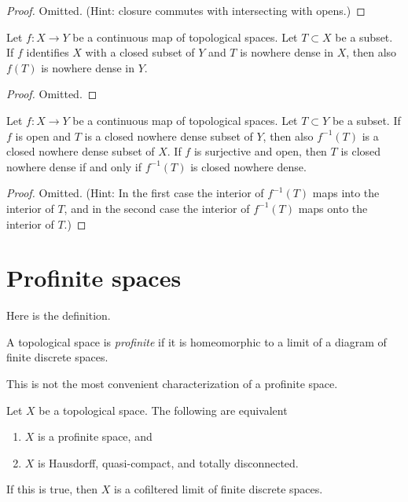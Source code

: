 \begin{proof}
Omitted. (Hint: closure commutes with intersecting with opens.)
\end{proof}

\begin{lemma}
\label{lemma-closed-image-nowhere-dense}
Let $f : X \to Y$ be a continuous map of topological spaces.
Let $T \subset X$ be a subset.
If $f$ identifies $X$ with a closed subset of $Y$
and $T$ is nowhere dense in $X$, then also $f(T)$ is nowhere dense in $Y$.
\end{lemma}

\begin{proof}
Omitted.
\end{proof}

\begin{lemma}
\label{lemma-open-inverse-image-closed-nowhere-dense}
Let $f : X \to Y$ be a continuous map of topological spaces.
Let $T \subset Y$ be a subset.
If $f$ is open and $T$ is a closed nowhere dense subset of $Y$,
then also $f^{-1}(T)$ is a closed nowhere dense subset of $X$.
If $f$ is surjective and open, then
$T$ is closed nowhere dense if and only
if $f^{-1}(T)$ is closed nowhere dense.
\end{lemma}

\begin{proof}
Omitted. (Hint: In the first case the interior of $f^{-1}(T)$
maps into the interior of $T$, and in the second case the interior of
$f^{-1}(T)$ maps onto the interior of $T$.)
\end{proof}






\section{Profinite spaces}
\label{section-profinite}

\noindent
Here is the definition.

\begin{definition}
\label{definition-profinite}
A topological space is {\it profinite} if it is homeomorphic to a limit
of a diagram of finite discrete spaces.
\end{definition}

\noindent
This is not the most convenient characterization of a profinite space.

\begin{lemma}
\label{lemma-profinite}
Let $X$ be a topological space.
The following are equivalent
\begin{enumerate}
\item $X$ is a profinite space, and
\item $X$ is Hausdorff, quasi-compact, and totally disconnected.
\end{enumerate}
If this is true, then $X$ is a cofiltered limit of finite discrete
spaces.
\end{lemma}

